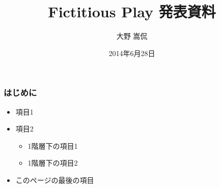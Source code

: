 \documentclass[dvipdfmx,fleqn]{beamer}
\title{\Large Fictitious Play 発表資料}
\author{\large 大野 嵩侃}
\date{\small 2014年6月28日}
\begin{document}
\sffamily
\gtfamily


\begin{frame}
  \titlepage
  \thispagestyle{empty}
\end{frame}

\setcounter{framenumber}{0}




\begin{frame}
\frametitle{はじめに}
\begin{itemize}\setlength{\parskip}{0.5em}
\item
項目1

\item
項目2
 \begin{itemize}\setlength{\parskip}{0.5em}
 \item
 1階層下の項目1
 \item
 1階層下の項目2
 \end{itemize}

\item
このページの最後の項目
\end{itemize}
\end{frame}
\end{document}
